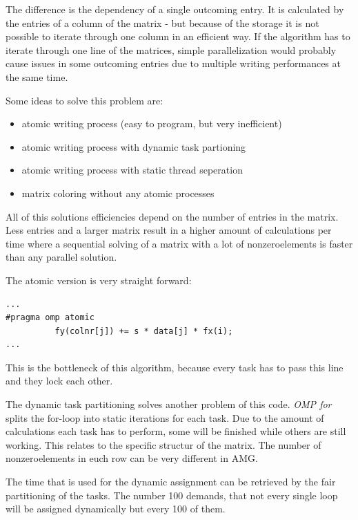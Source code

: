 \documentclass[a4paper,11pt]{scrartcl}
\begin{document}
The difference is the dependency of a single outcoming entry. It is calculated
 by the entries of a column of the matrix - but because of the storage it is not
possible to iterate through one column in an efficient way. If the algorithm
has to iterate through one line of the matrices, simple parallelization would
probably cause issues in some outcoming entries due to multiple writing
performances at the same time.

Some ideas to solve this problem are:

\begin{itemize}

\item atomic writing process (easy to program, but very inefficient)
\item atomic writing process with dynamic task partioning
\item atomic writing process with static thread seperation
\item matrix coloring without any atomic processes

\end{itemize}

All of this solutions efficiencies depend on the number of entries in the matrix.
Less entries and a larger matrix result in a higher amount of calculations per
 time where a sequential solving of a matrix with a lot of nonzeroelements is
 faster than any parallel solution.

The atomic version is very straight forward:

\begin{lstlisting}
...
#pragma omp atomic
          fy(colnr[j]) += s * data[j] * fx(i);
...
\end{lstlisting}

This is the bottleneck of this algorithm, because every task has to pass this
line and they lock each other.

The dynamic task partitioning solves another problem of this code. {\em OMP for}
 splits the for-loop into static iterations for each task. Due to the amount
 of calculations each task has to perform, some will be finished while others
are still working. This relates to the specific structur of the matrix. The
 number of nonzeroelements in euch row can be very different in AMG.

The time that is used for the dynamic assignment can be retrieved by the fair
partitioning of the tasks. The number 100 demands, that not every single loop
 will be assigned dynamically but every 100 of them.
\end{document}

